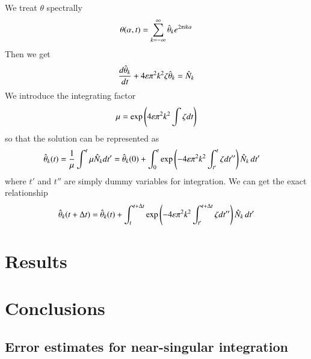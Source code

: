 \documentclass[preprint, 10pt]{elsarticle}
\begin{document}
We treat $\theta$ spectrally
\begin{equation}
\theta(\alpha,t) = \sum_{k = -\infty}^{\infty} \hat{\theta}_k e^{2\pi i k \alpha}
\end{equation}
Then we get
\begin{equation}
\frac{d \hat{\theta}_k}{d t} +  4 \varepsilon \pi^2 k^2  \zeta \hat{\theta}_k = \hat{N}_k
\end{equation}
We introduce the integrating factor
\begin{equation}
\mu = \exp \left( 4 \varepsilon \pi^2 k^2 \int \zeta dt \right)
\end{equation}
so that the solution can be represented as
\begin{align}
\hat{\theta}_k(t) & = \frac{1}{\mu} \int^t \mu \hat{N}_k dt'
= \hat{\theta}_k(0) + \int_0^t \exp \left( -4 \varepsilon \pi^2 k^2 \int_{t'}^t \zeta dt'' \right) \hat{N}_k \, dt'
\end{align}
where $t'$ and $t''$ are simply dummy variables for integration. We can get the exact relationship
\begin{equation}
\hat{\theta}_k(t + \Delta t) = \hat{\theta}_k(t) 
+ \int_t^{t+\Delta t} \exp \left( -4 \varepsilon \pi^2 k^2 \int_{t'}^{t+\Delta t} \zeta dt'' \right) \hat{N}_k \, dt'
\end{equation}











\section{Results\label{s:results}} 

\section{Conclusions\label{s:conclusions}}


\begin{appendices}
\section{Error estimates for near-singular integration \label{A:AppendixA}} 
\end{appendices}


 

\end{document}
